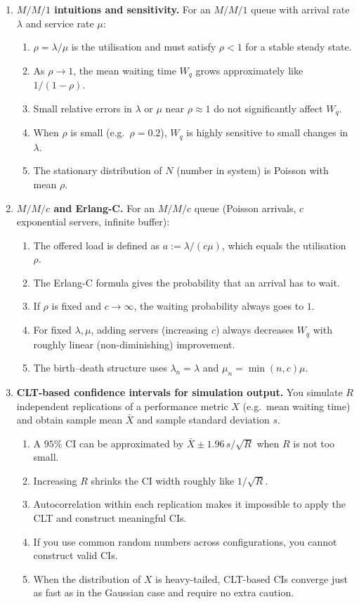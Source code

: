 \documentclass[a4paper,11pt]{article}
\begin{document}
\begin{enumerate}
\item \textbf{$M/M/1$ intuitions and sensitivity.} For an $M/M/1$ queue with arrival rate $\lambda$ and service rate $\mu$:
  \begin{enumerate}
    \item $\rho = \lambda/\mu$ is the utilisation and must satisfy $\rho < 1$ for a stable steady state.
    \item As $\rho \to 1$, the mean waiting time $W_q$ grows approximately like $1/(1-\rho)$.
    \item Small relative errors in $\lambda$ or $\mu$ near $\rho \approx 1$ do not significantly affect $W_q$.
    \item When $\rho$ is small (e.g.\ $\rho=0.2$), $W_q$ is highly sensitive to small changes in $\lambda$.
    \item The stationary distribution of $N$ (number in system) is Poisson with mean $\rho$.
  \end{enumerate}

\item \textbf{$M/M/c$ and Erlang-C.} For an $M/M/c$ queue (Poisson arrivals, $c$ exponential servers, infinite buffer):
  \begin{enumerate}
    \item The offered load is defined as $a := \lambda/(c\mu)$, which equals the utilisation $\rho$.
    \item The Erlang-C formula gives the probability that an arrival has to wait.
    \item If $\rho$ is fixed and $c \to \infty$, the waiting probability always goes to $1$.
    \item For fixed $\lambda,\mu$, adding servers (increasing $c$) always decreases $W_q$ with roughly linear (non-diminishing) improvement.
    \item The birth--death structure uses $\lambda_n=\lambda$ and $\mu_n = \min(n,c)\mu$.
  \end{enumerate}

\item \textbf{CLT-based confidence intervals for simulation output.} You simulate $R$ independent replications of a performance metric $X$ (e.g.\ mean waiting time) and obtain sample mean $\bar X$ and sample standard deviation $s$.
  \begin{enumerate}
    \item A $95\%$ CI can be approximated by $\bar X \pm 1.96\,s/\sqrt{R}$ when $R$ is not too small.
    \item Increasing $R$ shrinks the CI width roughly like $1/\sqrt{R}$.
    \item Autocorrelation within each replication makes it impossible to apply the CLT and construct meaningful CIs.
    \item If you use common random numbers across configurations, you cannot construct valid CIs.
    \item When the distribution of $X$ is heavy-tailed, CLT-based CIs converge just as fast as in the Gaussian case and require no extra caution.
  \end{enumerate}


\end{enumerate}
\end{document}
